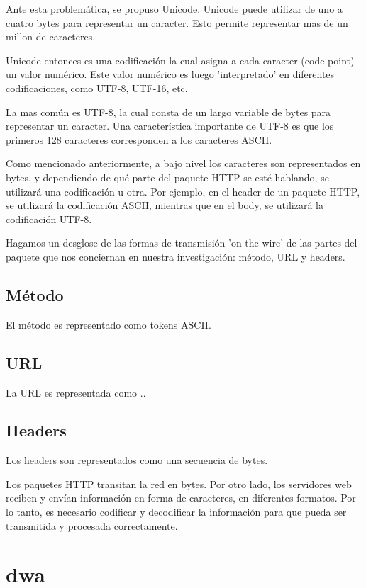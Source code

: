 \documentclass{prgrado}
\begin{document}
Ante esta problemática, se propuso Unicode. Unicode puede utilizar de uno a cuatro bytes para representar un caracter. Esto permite representar mas de un millon de caracteres.

Unicode entonces es una codificación la cual asigna a cada caracter (code point) un valor numérico. Este valor numérico es luego 'interpretado' en diferentes codificaciones, como UTF-8, UTF-16, etc.

La mas común es UTF-8, la cual consta de un largo variable de bytes para representar un caracter. Una característica importante de UTF-8 es que los primeros 128 caracteres corresponden a los caracteres ASCII.

Como mencionado anteriormente, a bajo nivel los caracteres son representados en bytes, y dependiendo de qué parte del paquete HTTP se esté hablando, se utilizará una codificación u otra. Por ejemplo, en el header de un paquete HTTP, se utilizará la codificación ASCII, mientras que en el body, se utilizará la codificación UTF-8.

Hagamos un desglose de las formas de transmisión 'on the wire' de las partes del paquete que nos conciernan en nuestra investigación: método, URL y headers.

\subsection{Método}

El método es representado como tokens ASCII.

\subsection{URL}

La URL es representada como ..

\subsection{Headers}

Los headers son representados como una secuencia de bytes.


Los paquetes HTTP transitan la red en bytes. Por otro lado, los servidores web reciben y envían información en forma de caracteres, en diferentes formatos. Por lo tanto, es necesario codificar y decodificar la información para que pueda ser transmitida y procesada correctamente.

\section{dwa}
\end{document}
